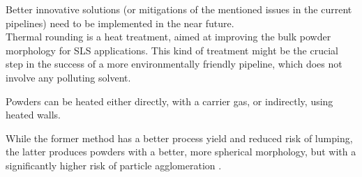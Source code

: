 \documentclass{article}
\begin{document}
    Better innovative solutions (or mitigations of the mentioned issues in the current pipelines) need to be implemented in the near future. \\ 

    Thermal rounding is a heat treatment, aimed at improving the bulk powder morphology for SLS applications. 
    This kind of treatment might be the crucial step in the success of a more environmentally friendly pipeline, which does not involve 
    any polluting solvent.

    Powders can be heated either directly, with a carrier gas, or indirectly, using heated walls. 

    While the former method has a better process yield and reduced risk of lumping, the latter produces powders with 
    a better, more spherical morphology, but with a significantly higher risk of particle agglomeration \autocite{Dechet_Schmidt_thermal_rounding}.

    \clearpage

%
%
%
%
%
\end{document}
